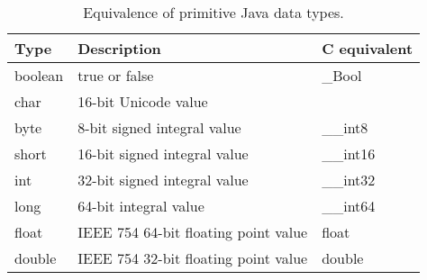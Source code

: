\documentclass[a4paper]{book}
\begin{document}
\begin{table}[H]
    \centering
    \label{table:primitve_data_type_conversions}
    \caption{Equivalence of primitive Java data types.}
    \begin{tabular}{lll}
    \hline
    \textbf{Type} & \textbf{Description}                 & \textbf{C equivalent} \\ \hline
    boolean       & true or false                        & \_Bool                \\
    char          & 16-bit Unicode value                 &                       \\
    byte          & 8-bit signed integral value          & \_\_int8              \\
    short         & 16-bit signed integral value         & \_\_int16             \\
    int           & 32-bit signed integral value         & \_\_int32             \\
    long          & 64-bit integral value                & \_\_int64             \\
    float         & IEEE 754 64-bit floating point value & float                 \\
    double        & IEEE 754 32-bit floating point value & double                \\ \hline
    \end{tabular}
\end{table}


 
\end{document}
